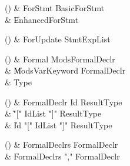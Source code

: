 \begin{bbgrammarappendix}{4.3in}

() & ForStmt \label{prod:ForStmt}  \: BasicForStmt  \\

 &    \| EnhancedForStmt \\

\end{bbgrammarappendix}

\begin{bbgrammarappendix}{4.1in}

() & ForUpdate \label{prod:ForUpdate}  \: StmtExpList  \\


\end{bbgrammarappendix}

\begin{bbgrammarappendix}{4.4in}

() & Formal \label{prod:Formal}  \: Mods\opt FormalDeclr  \\

 &    \| Mods\opt VarKeyword FormalDeclr \\
 &    \| Type \\

\end{bbgrammarappendix}

\begin{bbgrammarappendix}{3.9in}

() & FormalDeclr \label{prod:FormalDeclr}  \: Id ResultType  \\

 &    \| \xcd"[" IdList \xcd"]" ResultType \\
 &    \| Id \xcd"[" IdList \xcd"]" ResultType \\

\end{bbgrammarappendix}

\begin{bbgrammarappendix}{3.8in}

() & FormalDeclrs \label{prod:FormalDeclrs}  \: FormalDeclr  \\

 &    \| FormalDeclrs \xcd"," FormalDeclr \\

\end{bbgrammarappendix}

